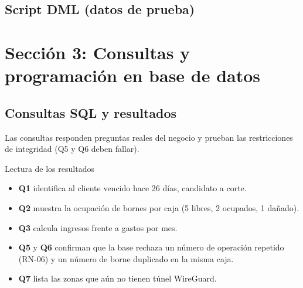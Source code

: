 \subsection{Script DML (datos de prueba)}



\section{Sección 3: Consultas y programación en base de datos}
\label{sec:ce02-consultas-prog}

\subsection{Consultas SQL y resultados}

Las consultas responden preguntas reales del negocio y prueban las restricciones de
integridad (Q5 y Q6 deben fallar).





\begin{upeubox}{Lectura de los resultados}
\begin{itemize}[leftmargin=1.2em]
  \item \textbf{Q1} identifica al cliente vencido hace 26 días, candidato a corte.
  \item \textbf{Q2} muestra la ocupación de bornes por caja (5 libres, 2 ocupados, 1 dañado).
  \item \textbf{Q3} calcula ingresos frente a gastos por mes.
  \item \textbf{Q5} y \textbf{Q6} confirman que la base rechaza un número de operación
  repetido (RN-06) y un número de borne duplicado en la misma caja.
  \item \textbf{Q7} lista las zonas que aún no tienen túnel WireGuard.
\end{itemize}
\end{upeubox}


